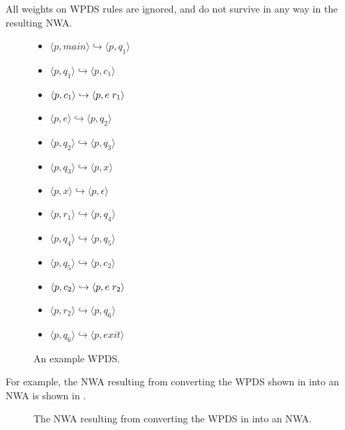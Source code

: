 All weights on WPDS rules are ignored, and do not survive in any way in the
resulting NWA.


\begin{figure}[t]
  \centering
    \begin{itemize}
      \centering
      \item{ $\langle p,main \rangle \hookrightarrow \langle p,q_1 \rangle$}
      \item{ $\langle p,q_1 \rangle \hookrightarrow \langle p,c_1 \rangle$}
      \item{ $\langle p,c_1 \rangle \hookrightarrow \langle p,e \hspace{.1cm} r_1 \rangle$}
      \item{ $\langle p,e \rangle \hookrightarrow \langle p,q_2 \rangle$}
      \item{ $\langle p,q_2 \rangle \hookrightarrow \langle p,q_3 \rangle$}
      \item{ $\langle p,q_3 \rangle \hookrightarrow \langle p,x \rangle$}
      \item{ $\langle p,x \rangle \hookrightarrow \langle p,\epsilon \rangle$}
      \item{ $\langle p,r_1 \rangle \hookrightarrow \langle p,q_4 \rangle$}
      \item{ $\langle p,q_4 \rangle \hookrightarrow \langle p,q_5 \rangle$}
      \item{ $\langle p,q_5 \rangle \hookrightarrow \langle p,c_2 \rangle$}
      \item{ $\langle p,c_2 \rangle \hookrightarrow \langle p,e \hspace{.1cm} r_2 \rangle$}
      \item{ $\langle p,r_2 \rangle \hookrightarrow \langle p,q_6 \rangle$}
      \item{ $\langle p,q_6 \rangle \hookrightarrow \langle p,exit \rangle$}
    \end{itemize}
  \caption{An example WPDS.}
  \label{Fi:WpdsToNwa1}
\end{figure}

For example, the NWA resulting from converting the WPDS shown in
 into an NWA is shown in .

\begin{figure}[t]
  \centering
  \caption{The NWA resulting from converting the WPDS in  into an NWA.}
  \label{Fi:WpdsToNwa2}
\end{figure}


